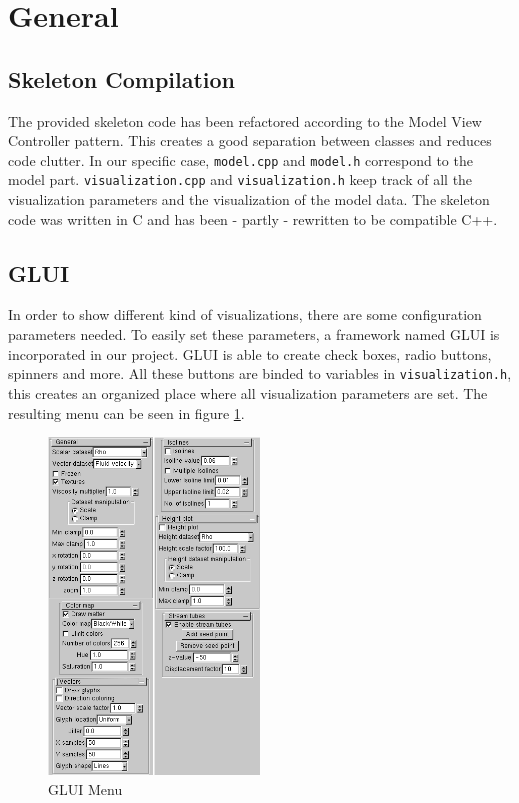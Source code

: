 \section{General}
	\label{sec:general}

	\subsection{Skeleton Compilation}
    The provided skeleton code has been refactored according to the Model View Controller pattern. This creates a good separation between classes and reduces code clutter.
    In our specific case, \texttt{model.cpp} and \texttt{model.h} correspond to the model part. \texttt{visualization.cpp} and \texttt{visualization.h} keep track of all the visualization parameters and the visualization of the model data.
    The skeleton code was written in C and has been - partly - rewritten to be compatible C++.

    \subsection{GLUI}
        In order to show different kind of visualizations, there are some configuration parameters needed.
        To easily set these parameters, a framework named GLUI \cite{glui} is incorporated in our project.
        GLUI is able to create check boxes, radio buttons, spinners and more.
        All these buttons are binded to variables in \texttt{visualization.h}, this creates an organized place where all visualization parameters are set.
        The resulting menu can be seen in figure \ref{fig:menu}.
        \begin{figure}[htb]
            \centering
            \includegraphics[width =0.5\textwidth]{content/pictures/menu.png}
            \caption{GLUI Menu}
            \label{fig:menu}
        \end{figure}